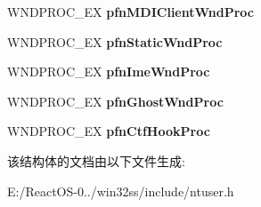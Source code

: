 \begin{DoxyCompactItemize}
W\+N\+D\+P\+R\+O\+C\+\_\+\+EX {\bfseries pfn\+M\+D\+I\+Client\+Wnd\+Proc}
\item 
\mbox{\label{struct___p_f_n_c_l_i_e_n_t_w_o_r_k_e_r_aebd9335916afda513a8037bfec8d8155}} 
W\+N\+D\+P\+R\+O\+C\+\_\+\+EX {\bfseries pfn\+Static\+Wnd\+Proc}
\item 
\mbox{\label{struct___p_f_n_c_l_i_e_n_t_w_o_r_k_e_r_a3cdab87c43718db56a47bd5d02c90f58}} 
W\+N\+D\+P\+R\+O\+C\+\_\+\+EX {\bfseries pfn\+Ime\+Wnd\+Proc}
\item 
\mbox{\label{struct___p_f_n_c_l_i_e_n_t_w_o_r_k_e_r_a525d0155a2c37ef5d9b9adfc4af3644b}} 
W\+N\+D\+P\+R\+O\+C\+\_\+\+EX {\bfseries pfn\+Ghost\+Wnd\+Proc}
\item 
\mbox{\label{struct___p_f_n_c_l_i_e_n_t_w_o_r_k_e_r_aee2ea34279adf870f74f5fad097466b1}} 
W\+N\+D\+P\+R\+O\+C\+\_\+\+EX {\bfseries pfn\+Ctf\+Hook\+Proc}
\end{DoxyCompactItemize}


该结构体的文档由以下文件生成\+:\begin{DoxyCompactItemize}
\item 
E\+:/\+React\+O\+S-\/0../win32ss/include/ntuser.\+h\end{DoxyCompactItemize}
